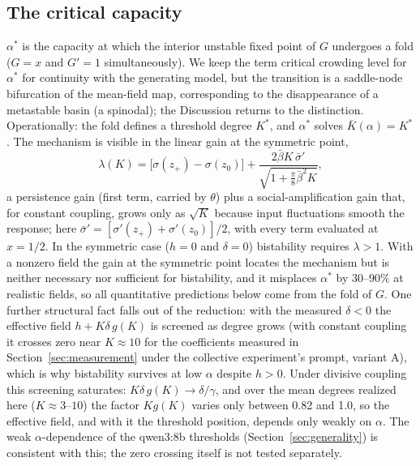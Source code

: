 \documentclass[11pt]{article}
\newcommand{\astar}{\alpha^{*}}
\begin{document}
\subsection{The critical capacity}\label{sec:critical}

$\astar$ is the capacity at which the interior unstable fixed point of $G$
undergoes a fold ($G = x$ and $G' = 1$ simultaneously). We keep the term
critical crowding level for $\astar$ for continuity with the generating
model, but the transition is a saddle-node bifurcation of the mean-field
map, corresponding to the disappearance of a metastable basin (a spinodal);
the Discussion returns to the distinction. Operationally: the
fold defines a threshold degree $K^*$, and $\astar$ solves
$\bar K(\alpha) = K^*$. The mechanism is visible in the linear gain at the
symmetric point,
\begin{equation}
\lambda(K) = \bigl[\sigma(z_+) - \sigma(z_0)\bigr]
+ \frac{2\bar\beta K\,\bar\sigma'}{\sqrt{1 + \tfrac{\pi}{8}\bar\beta^2 K}},
\end{equation}
a persistence gain (first term, carried by $\theta$) plus a
social-amplification gain that, for constant coupling, grows only as
$\sqrt{K}$ because input fluctuations smooth the response; here
$\bar\sigma' = [\sigma'(z_+) + \sigma'(z_0)]/2$, with every term evaluated at
$x = 1/2$. In the symmetric case ($h = 0$ and $\delta = 0$) bistability requires $\lambda > 1$.
With a nonzero field the gain at the symmetric point locates the mechanism
but is neither necessary nor sufficient for bistability, and it misplaces
$\astar$ by 30--90\% at realistic fields, so all quantitative predictions
below come from the fold of $G$. One further structural fact falls out of the
reduction: with the measured $\delta < 0$ the effective field
$h + K\delta\,g(K)$ is screened as degree grows (with constant coupling it
crosses zero near $K \approx 10$ for the coefficients measured in
Section~\ref{sec:measurement} under the collective experiment's prompt,
variant A), which is why bistability survives at low $\alpha$ despite
$h > 0$. Under divisive coupling this screening saturates: $K\delta\,g(K)
\to \delta/\gamma$, and over the mean degrees realized here ($K \approx 3$--$10$)
the factor $K g(K)$ varies only between 0.82 and 1.0, so the effective field, and
with it the threshold position, depends only weakly on $\alpha$. The weak
$\alpha$-dependence of the qwen3:8b thresholds (Section~\ref{sec:generality})
is consistent with this; the zero crossing itself is not tested separately.
\end{document}

